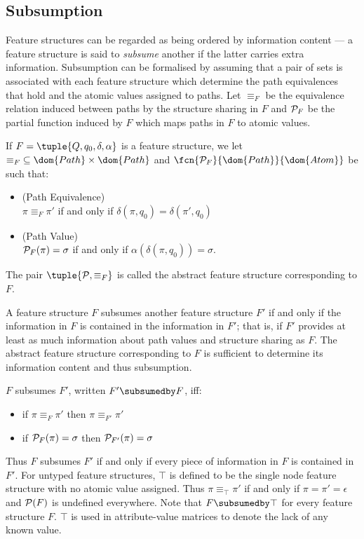 \documentclass[12pt]{report}
\begin{document}
\subsection{Subsumption}
\label{untsub}

Feature structures can be regarded as being ordered by information
content --- a feature structure is said
to {\em subsume} another if the latter carries extra information.
Subsumption can be formalised by assuming that
a pair of sets is associated with each feature structure
which determine the path equivalences that hold and the
atomic values assigned to paths.  
Let $\equiv_{F}$ be the equivalence relation induced
between paths by the structure sharing in $F$ and ${\cal P}_{F}$ be
the partial function induced by $F$ which maps paths in $F$ to atomic
values. 
%
\begin{definition}
If $F = \tuple{Q,q_{0},\delta,\alpha}$ is a feature structure, we let
$\equiv_{F} \; \subseteq \dom{Path} \times \dom{Path}$ and
$\fcn{{\cal P}_{F}}{\dom{Path}}{\dom{Atom}}$ be such that:
\begin{itemize}
\item
(Path Equivalence) \\
$\pi \equiv_{F} \pi'$ 
if and only if $\delta(\pi,q_{0}) = \delta(\pi',q_{0})$
\item
(Path Value) \\
${\cal P}_{F}(\pi) = \sigma$ 
if and only if
$\alpha(\delta(\pi,q_{0})) = \sigma$.
\end{itemize}
The pair $\tuple{{\cal P},\equiv_{F}}$ is called the abstract
feature structure corresponding to $F$.
\end{definition}
%

A feature structure $F$ subsumes another feature
structure $F'$ if and only if the information in $F$ is contained in
the information in $F'$;  that is, if $F'$ provides at least as much
information about path values and structure sharing as $F$.  The
abstract feature structure corresponding to $F$ is sufficient to
determine its information content and thus subsumption.
%
\begin{definition}[Subsumption]
$F$ subsumes $F'$, written $F' \subsumedby F$, iff:
\begin{itemize}
\item if $\pi \equiv_{F} \pi'$ then $\pi \equiv_{F'} \pi'$
\item if ${\cal P}_{F}(\pi) = \sigma$ then ${\cal P}_{F'}(\pi) = \sigma$
\end{itemize}
\end{definition}
%
Thus $F$ subsumes $F'$ if and only if every piece of information in
$F$ is contained in $F'$.   For untyped feature structures,
$\top$ is defined to be the single node feature structure with no atomic
value assigned.  Thus $\pi \equiv_{\top} \pi'$ if and only if $\pi =
\pi' = \epsilon$ and ${\cal P}(F)$ is undefined everywhere.  Note that
$F \subsumedby \top $ for every feature structure $F$.  $\top$ is used
in attribute-value matrices to denote the lack of
any known value.
\end{document}
